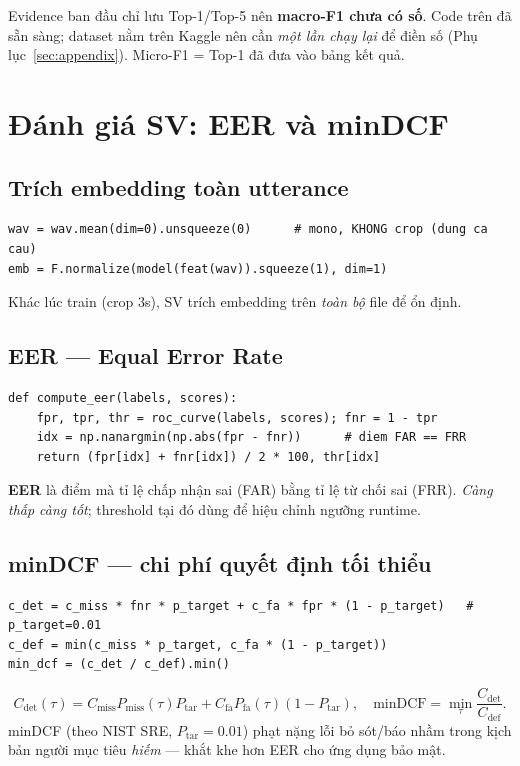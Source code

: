 \documentclass[12pt,a4paper]{article}
\begin{document}
\begin{luuybox}
Evidence ban đầu chỉ lưu Top-1/Top-5 nên \textbf{macro-F1 chưa có số}. Code trên đã
sẵn sàng; dataset nằm trên Kaggle nên cần \emph{một lần chạy lại} để điền số
(Phụ lục~\ref{sec:appendix}). Micro-F1 = Top-1 đã đưa vào bảng kết quả.
\end{luuybox}

\section{Đánh giá SV: EER và minDCF}
\subsection{Trích embedding toàn utterance}
\begin{lstlisting}
wav = wav.mean(dim=0).unsqueeze(0)      # mono, KHONG crop (dung ca cau)
emb = F.normalize(model(feat(wav)).squeeze(1), dim=1)
\end{lstlisting}
Khác lúc train (crop 3s), SV trích embedding trên \emph{toàn bộ} file để ổn định.

\subsection{EER --- Equal Error Rate}
\begin{lstlisting}
def compute_eer(labels, scores):
    fpr, tpr, thr = roc_curve(labels, scores); fnr = 1 - tpr
    idx = np.nanargmin(np.abs(fpr - fnr))      # diem FAR == FRR
    return (fpr[idx] + fnr[idx]) / 2 * 100, thr[idx]
\end{lstlisting}
\textbf{EER} là điểm mà tỉ lệ chấp nhận sai (FAR) bằng tỉ lệ từ chối sai (FRR).
\emph{Càng thấp càng tốt}; threshold tại đó dùng để hiệu chỉnh ngưỡng runtime.

\subsection{minDCF --- chi phí quyết định tối thiểu}
\begin{lstlisting}
c_det = c_miss * fnr * p_target + c_fa * fpr * (1 - p_target)   # p_target=0.01
c_def = min(c_miss * p_target, c_fa * (1 - p_target))
min_dcf = (c_det / c_def).min()
\end{lstlisting}
\[
C_{\text{det}}(\tau)=C_{\text{miss}}P_{\text{miss}}(\tau)P_{\text{tar}}
+C_{\text{fa}}P_{\text{fa}}(\tau)(1-P_{\text{tar}}),\quad
\text{minDCF}=\min_\tau \frac{C_{\text{det}}}{C_{\text{def}}}.
\]
minDCF (theo NIST SRE, $P_{\text{tar}}=0.01$) phạt nặng lỗi bỏ sót/báo nhầm trong
kịch bản người mục tiêu \emph{hiếm} --- khắt khe hơn EER cho ứng dụng bảo mật.
\end{document}
